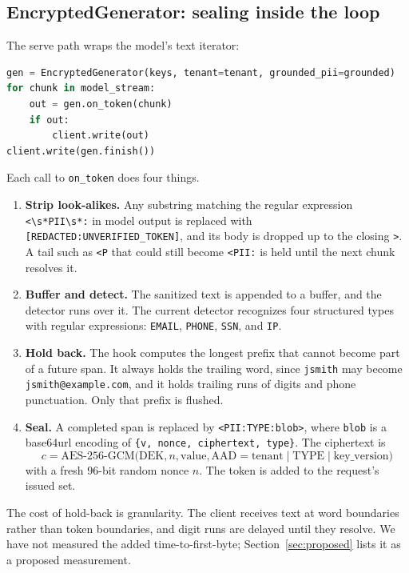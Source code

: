 \documentclass[11pt]{article}
\newcommand{\code}[1]{\texttt{#1}}
\begin{document}
\subsection{EncryptedGenerator: sealing inside the loop}
\label{sec:generator}

The serve path wraps the model's text iterator:
\begin{lstlisting}[language=Python]
gen = EncryptedGenerator(keys, tenant=tenant, grounded_pii=grounded)
for chunk in model_stream:
    out = gen.on_token(chunk)
    if out:
        client.write(out)
client.write(gen.finish())
\end{lstlisting}

Each call to \code{on\_token} does four things.
\begin{enumerate}
  \item \textbf{Strip look-alikes.} Any substring matching the regular expression \lstinline!<\s*PII\s*:! in model output is replaced with \code{[REDACTED:UNVERIFIED\_TOKEN]}, and its body is dropped up to the closing \code{>}. A tail such as \code{<P} that could still become \code{<PII:} is held until the next chunk resolves it.
  \item \textbf{Buffer and detect.} The sanitized text is appended to a buffer, and the detector runs over it. The current detector recognizes four structured types with regular expressions: \code{EMAIL}, \code{PHONE}, \code{SSN}, and \code{IP}.
  \item \textbf{Hold back.} The hook computes the longest prefix that cannot become part of a future span. It always holds the trailing word, since \code{jsmith} may become \code{jsmith@example.com}, and it holds trailing runs of digits and phone punctuation. Only that prefix is flushed.
  \item \textbf{Seal.} A completed span is replaced by \code{<PII:TYPE:blob>}, where \code{blob} is a base64url encoding of \code{\{v, nonce, ciphertext, type\}}. The ciphertext is
  \begin{equation}
    c = \mathrm{AES\text{-}256\text{-}GCM}\big(\mathrm{DEK}, n, \text{value}, \mathrm{AAD} = \text{tenant} \mid \text{TYPE} \mid \text{key\_version}\big)
    \label{eq:seal}
  \end{equation}
  with a fresh 96-bit random nonce $n$. The token is added to the request's issued set.
\end{enumerate}

The cost of hold-back is granularity. The client receives text at word boundaries rather than token boundaries, and digit runs are delayed until they resolve. We have not measured the added time-to-first-byte; Section~\ref{sec:proposed} lists it as a proposed measurement.
\end{document}
